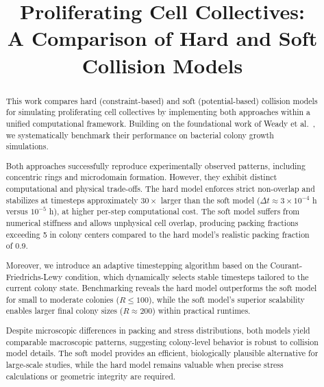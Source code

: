 \documentclass[conference]{IEEEtran}
\begin{document}
\title{Proliferating Cell Collectives: \\A Comparison of Hard and Soft Collision Models}

\author{
}

\maketitle

\begin{abstract}
    This work compares hard (constraint-based) and soft (potential-based) collision models for simulating proliferating cell collectives by implementing both approaches within a unified computational framework. Building on the foundational work of Weady et al.~\cite{Weady2024}, we systematically benchmark their performance on bacterial colony growth simulations.

    Both approaches successfully reproduce experimentally observed patterns, including concentric rings and microdomain formation. However, they exhibit distinct computational and physical trade-offs. The hard model enforces strict non-overlap and stabilizes at timesteps approximately $30\times$ larger than the soft model ($\Delta t \approx 3 \times 10^{-4}$ h versus $10^{-5}$ h), at higher per-step computational cost. The soft model suffers from numerical stiffness and allows unphysical cell overlap, producing packing fractions exceeding 5 in colony centers compared to the hard model's realistic packing fraction of 0.9.

    Moreover, we introduce an adaptive timestepping algorithm based on the Courant-Friedrichs-Lewy condition, which dynamically selects stable timesteps tailored to the current colony state. Benchmarking reveals the hard model outperforms the soft model for small to moderate colonies ($R \leq 100$), while the soft model's superior scalability enables larger final colony sizes ($R \approx 200$) within practical runtimes.

    Despite microscopic differences in packing and stress distributions, both models yield comparable macroscopic patterns, suggesting colony-level behavior is robust to collision model details. The soft model provides an efficient, biologically plausible alternative for large-scale studies, while the hard model remains valuable when precise stress calculations or geometric integrity are required.
\end{abstract}
\end{document}
